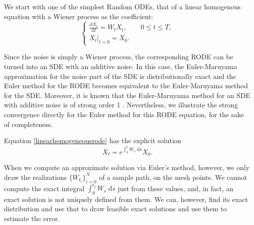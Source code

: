 \documentclass[reqno,12pt]{amsart}
\theoremstyle{plain} %
\theoremstyle{definition} %
\begin{document}
We start with one of the simplest Random ODEs, that of a linear homogenous equation with a Wiener process as the coefficient:
\begin{equation}
    \label{linearhomogeneousrode}
    \begin{cases}
        \displaystyle \frac{\mathrm{d}X_t}{\mathrm{d} t} = W_t X_t, \qquad 0 \leq t \leq T, \\
        \left. X_t \right|_{t = 0} = X_0.
      \end{cases}
\end{equation}

Since the noise is simply a Wiener process, the corresponding RODE can be turned into an SDE with an additive noise. In this case, the Euler-Maruyama approximation for the noise part of the SDE is distributionally exact and the Euler method for the RODE becomes equivalent to the Euler-Maruyama method for the SDE. Moreover, it is known that the Euler-Maruyama method for an SDE with additive noise is of strong order 1 \cite{HighamKloeden2021}. Nevertheless, we illustrate the strong convergence directly for the Euler method for this RODE equation, for the sake of completeness.

Equation \eqref{linearhomogeneousrode} has the explicit solution
\begin{equation}
    X_t = e^{\int_0^t W_s \;\mathrm{d}s}X_0.
\end{equation}

When we compute an approximate solution via Euler's method, however, we only draw the realizations $\{W_{t_i}\}_{i=0}^N$ of a sample path, on the mesh points. We cannot compute the exact integral $\int_0^{t_j} W_s\;\mathrm{d}s$ just from these values, and, in fact, an exact solution is not uniquely defined from them. We can, however, find its exact distribution and use that to draw feasible exact solutions and use them to estimate the error.
\end{document}
